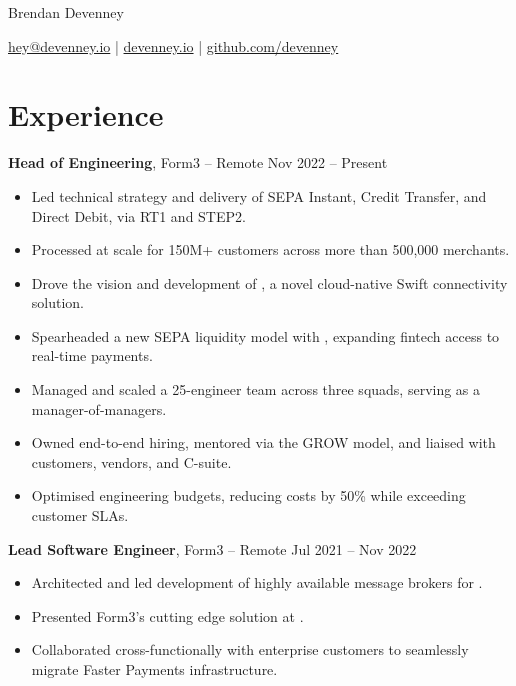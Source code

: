 \documentclass[11pt]{article}       %
\begin{document}
\centerline{\Huge Brendan Devenney}

\vspace{5pt}

\centerline{\href{mailto:hey@devenney.io}{hey@devenney.io} | \href{https://devenney.io}{devenney.io} | \href{https://github.com/devenney}{github.com/devenney}}

\vspace{-10pt}

\section*{Experience}

\textbf{Head of Engineering}, Form3 -- Remote \hfill Nov 2022 -- Present \\
\vspace{-9pt}
\begin{itemize}
  \item Led technical strategy and delivery of SEPA Instant, Credit Transfer, and Direct Debit, via RT1 and STEP2. \\
  \item Processed  at scale for 150M+ customers across more than 500,000 merchants. \\
  \item Drove the vision and development of , a novel cloud-native Swift connectivity solution. \\
  \item Spearheaded a new SEPA liquidity model with , expanding fintech access to real-time payments. \\
  \item Managed and scaled a 25-engineer team across three squads, serving as a manager-of-managers. \\
  \item Owned end-to-end hiring, mentored via the GROW model, and liaised with customers, vendors, and C-suite. \\
  \item Optimised engineering budgets, reducing costs by 50\% while exceeding customer SLAs. \\
\end{itemize}

\textbf{Lead Software Engineer}, Form3 -- Remote \hfill Jul 2021 -- Nov 2022 \\
\vspace{-9pt}
\begin{itemize}
  \item Architected and led development of highly available message brokers for . \\
  \item Presented Form3's cutting edge solution at . \\
  \item Collaborated cross-functionally with enterprise customers to seamlessly migrate Faster Payments infrastructure. \\
\end{itemize}
\end{document}
